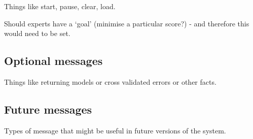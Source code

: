 \documentclass[twoside,11pt]{article}
\begin{document}
Things like start, pause, clear, load.

Should experts have a `goal' (\eg minimise a particular score?) - and therefore this would need to be set.

\subsection{Optional messages}

Things like returning models or cross validated errors or other facts.

\subsection{Future messages}

Types of message that might be useful in future versions of the system. 

\newpage


\vskip 0.2in

\end{document}
